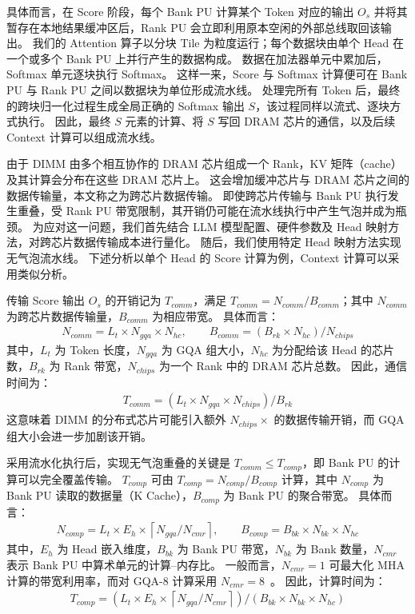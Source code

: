 具体而言，在 Score 阶段，每个 Bank PU 计算某个 Token 对应的输出 $O_s$ 并将其暂存在本地结果缓冲区后，Rank PU 会立即利用原本空闲的外部总线取回该输出。
我们的 Attention 算子以分块 Tile 为粒度运行；每个数据块由单个 Head 在一个或多个 Bank PU 上并行产生的数据构成。
数据在加法器单元中累加后，Softmax 单元逐块执行 Softmax。
这样一来，Score 与 Softmax 计算便可在 Bank PU 与 Rank PU 之间以数据块为单位形成流水线。
处理完所有 Token 后，最终的跨块归一化过程生成全局正确的 Softmax 输出 $S$，该过程同样以流式、逐块方式执行。
因此，最终 $S$ 元素的计算、将 $S$ 写回 DRAM 芯片的通信，以及后续 Context 计算可以组成流水线。

\label{sec:design-dp-pipeline}
由于 DIMM 由多个相互协作的 DRAM 芯片组成一个 Rank，KV 矩阵（cache）及其计算会分布在这些 DRAM 芯片上。
这会增加缓冲芯片与 DRAM 芯片之间的数据传输量，本文称之为跨芯片数据传输。
即使跨芯片传输与 Bank PU 执行发生重叠，受 Rank PU 带宽限制，其开销仍可能在流水线执行中产生气泡并成为瓶颈。
为应对这一问题，我们首先结合 LLM 模型配置、硬件参数及 Head 映射方法，对跨芯片数据传输成本进行量化。
随后，我们使用特定 Head 映射方法实现无气泡流水线。
下述分析以单个 Head 的 Score 计算为例，Context 计算可以采用类似分析。

传输 Score 输出 $O_s$ 的开销记为 $T_{comm}$，满足 $T_{comm}={N_{comm}}/{B_{comm}}$；其中 $N_{comm}$ 为跨芯片数据传输量，$B_{comm}$ 为相应带宽。
具体而言：
\begin{align*}
  {N_{comm}}={L_t}\times{N_{gqa}}\times{N_{hc}}, \qquad
  {B_{comm}}=({B_{rk}}\times{N_{hc}})/N_{chips}
\end{align*}
其中，$L_t$ 为 Token 长度，$N_{gqa}$ 为 GQA 组大小，$N_{hc}$ 为分配给该 Head 的芯片数，$B_{rk}$ 为 Rank 带宽，$N_{chips}$ 为一个 Rank 中的 DRAM 芯片总数。
因此，通信时间为：
\begin{align*}
  {T_{comm}}=({L_t}\times{N_{gqa}}\times{N_{chips}})/{B_{rk}}
\end{align*}
这意味着 DIMM 的分布式芯片可能引入额外 $N_{chips}\times$ 的数据传输开销，而 GQA 组大小会进一步加剧该开销。

采用流水化执行后，实现无气泡重叠的关键是 $T_{comm}\le T_{comp}$，即 Bank PU 的计算可以完全覆盖传输。
$T_{comp}$ 可由 $T_{comp}={N_{comp}}/{B_{comp}}$ 计算，其中 $N_{comp}$ 为 Bank PU 读取的数据量（K Cache），$B_{comp}$ 为 Bank PU 的聚合带宽。
具体而言：
\begin{align*}
  {N_{comp}}={L_t}\times{E_h}\times\left\lceil {N_{gqa}}/{N_{cmr}} \right\rceil, \qquad
  {B_{comp}}={B_{bk}}\times{N_{bk}}\times{N_{hc}}
\end{align*}
其中，$E_h$ 为 Head 嵌入维度，$B_{bk}$ 为 Bank PU 带宽，$N_{bk}$ 为 Bank 数量，$N_{cmr}$ 表示 Bank PU 中算术单元的计算--内存比。
一般而言，$N_{cmr}=1$ 可最大化 MHA 计算的带宽利用率，而对 GQA-8 计算采用 $N_{cmr}=8$~\cite{park2024attacc}。
因此，计算时间为：
\begin{align*}
  {T_{comp}}=({L_t}\times{E_h}\times\left\lceil {N_{gqa}}/{N_{cmr}} \right\rceil)/({B_{bk}}\times{N_{bk}}\times{N_{hc}})
\end{align*}

